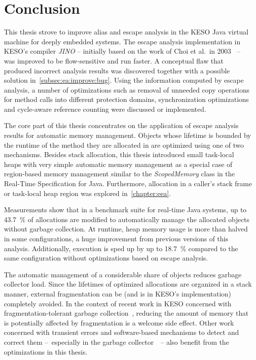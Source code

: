 
\chapter{Conclusion}
	\label{chapter:conclusion}
	This thesis strove to improve alias and escape analysis in the KESO Java virtual machine for deeply embedded systems.
	The escape analysis implementation in KESO's compiler \emph{JINO} – initially based on the work of Choi et al.\ in
	2003~\cite{choi:03:toplas} – was improved to be flow-sensitive and run faster. A conceptual flaw that produced
	incorrect analysis results was discovered together with a possible solution in~\cref{subsec:ea:improve:bug}. Using the
	information computed by escape analysis, a number of optimizations such as removal of unneeded copy operations for
	method calls into different protection domains, synchronization optimizations and cycle-aware reference counting were
	discussed or implemented.

	The core part of this thesis concentrates on the application of escape analysis results for automatic memory
	management. Objects whose lifetime is bounded by the runtime of the method they are allocated in are optimized using
	one of two mechanisms. Besides stack allocation, this thesis introduced small task-local heaps with very simple
	automatic memory management as a special case of region-based memory management similar to the \emph{ScopedMemory}
	class in the Real-Time Specification for Java. Furthermore, allocation in a caller's stack frame or task-local heap
	region was explored in~\cref{chapter:eea}.

	Measurements show that in a benchmark suite for real-time Java systems, up to 43.7~\% of allocations are modified to
	automatically manage the allocated objects without garbage collection. At runtime, heap memory usage is more than
	halved in some configurations, a huge improvement from previous versions of this analysis. Additionally, execution is
	sped up by up to 18.7~\% compared to the same configuration without optimizations based on escape analysis.

	The automatic management of a considerable share of objects reduces garbage collector load. Since the lifetimes of
	optimized allocations are organized in a stack manner, external fragmentation can be (and is in KESO's implementation)
	completely avoided. In the context of recent work in KESO concerned with fragmentation-tolerant garbage
	collection~\cite{strotz:14}, reducing the amount of memory that is potentially affected by fragmentation is a welcome
	side effect. Other work concerned with transient errors and software-based mechanisms to detect and correct them
	–~especially in the garbage collector~\cite{taffner:14}~– also benefit from the optimizations in this thesis.

